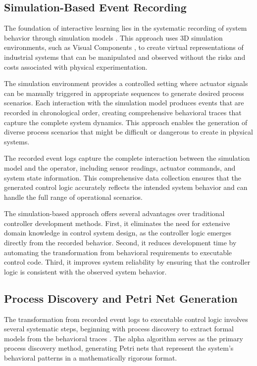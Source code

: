 \subsection{Simulation-Based Event Recording}

The foundation of interactive learning lies in the systematic recording of system behavior through simulation models \cite{hegny2010iec}. This approach uses 3D simulation environments, such as Visual Components \cite{visualcomponent}, to create virtual representations of industrial systems that can be manipulated and observed without the risks and costs associated with physical experimentation.

The simulation environment provides a controlled setting where actuator signals can be manually triggered in appropriate sequences to generate desired process scenarios. Each interaction with the simulation model produces events that are recorded in chronological order, creating comprehensive behavioral traces that capture the complete system dynamics. This approach enables the generation of diverse process scenarios that might be difficult or dangerous to create in physical systems.



The recorded event logs capture the complete interaction between the simulation model and the operator, including sensor readings, actuator commands, and system state information. This comprehensive data collection ensures that the generated control logic accurately reflects the intended system behavior and can handle the full range of operational scenarios.

The simulation-based approach offers several advantages over traditional controller development methods. First, it eliminates the need for extensive domain knowledge in control system design, as the controller logic emerges directly from the recorded behavior. Second, it reduces development time by automating the transformation from behavioral requirements to executable control code. Third, it improves system reliability by ensuring that the controller logic is consistent with the observed system behavior.

\subsection{Process Discovery and Petri Net Generation}

The transformation from recorded event logs to executable control logic involves several systematic steps, beginning with process discovery to extract formal models from the behavioral traces \cite{van2013discovering}. The alpha algorithm serves as the primary process discovery method, generating Petri nets that represent the system's behavioral patterns in a mathematically rigorous format.

